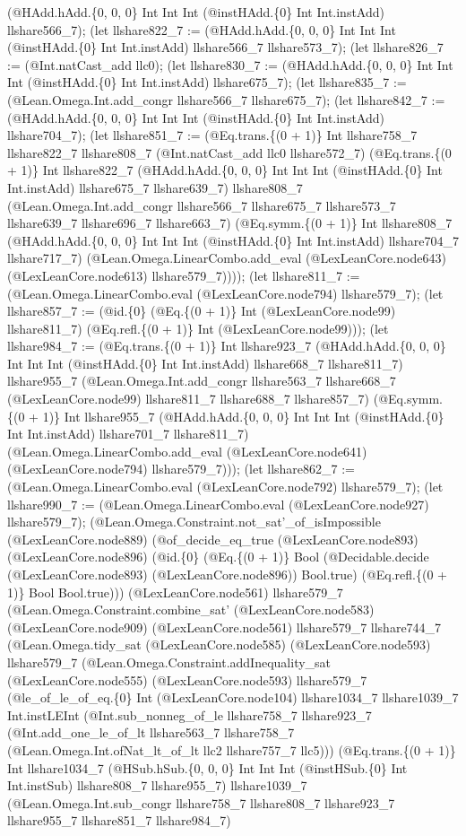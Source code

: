 \documentclass[11pt]{article}
\begin{document}
(@HAdd.hAdd.\{0, 0, 0\} Int Int Int (@instHAdd.\{0\} Int Int.instAdd) llshare566\_7); (let llshare822\_7 := (@HAdd.hAdd.\{0, 0, 0\} Int Int Int (@instHAdd.\{0\} Int Int.instAdd) llshare566\_7 llshare573\_7); (let llshare826\_7 := (@Int.natCast\_add llc0); (let llshare830\_7 := (@HAdd.hAdd.\{0, 0, 0\} Int Int Int (@instHAdd.\{0\} Int Int.instAdd) llshare675\_7); (let llshare835\_7 := (@Lean.Omega.Int.add\_congr llshare566\_7 llshare675\_7); (let llshare842\_7 := (@HAdd.hAdd.\{0, 0, 0\} Int Int Int (@instHAdd.\{0\} Int Int.instAdd) llshare704\_7); (let llshare851\_7 := (@Eq.trans.\{(0 + 1)\} Int llshare758\_7 llshare822\_7 llshare808\_7 (@Int.natCast\_add llc0 llshare572\_7) (@Eq.trans.\{(0 + 1)\} Int llshare822\_7 (@HAdd.hAdd.\{0, 0, 0\} Int Int Int (@instHAdd.\{0\} Int Int.instAdd) llshare675\_7 llshare639\_7) llshare808\_7 (@Lean.Omega.Int.add\_congr llshare566\_7 llshare675\_7 llshare573\_7 llshare639\_7 llshare696\_7 llshare663\_7) (@Eq.symm.\{(0 + 1)\} Int llshare808\_7 (@HAdd.hAdd.\{0, 0, 0\} Int Int Int (@instHAdd.\{0\} Int Int.instAdd) llshare704\_7 llshare717\_7) (@Lean.Omega.LinearCombo.add\_eval (@LexLeanCore.node643) (@LexLeanCore.node613) llshare579\_7)))); (let llshare811\_7 := (@Lean.Omega.LinearCombo.eval (@LexLeanCore.node794) llshare579\_7); (let llshare857\_7 := (@id.\{0\} (@Eq.\{(0 + 1)\} Int (@LexLeanCore.node99) llshare811\_7) (@Eq.refl.\{(0 + 1)\} Int (@LexLeanCore.node99))); (let llshare984\_7 := (@Eq.trans.\{(0 + 1)\} Int llshare923\_7 (@HAdd.hAdd.\{0, 0, 0\} Int Int Int (@instHAdd.\{0\} Int Int.instAdd) llshare668\_7 llshare811\_7) llshare955\_7 (@Lean.Omega.Int.add\_congr llshare563\_7 llshare668\_7 (@LexLeanCore.node99) llshare811\_7 llshare688\_7 llshare857\_7) (@Eq.symm.\{(0 + 1)\} Int llshare955\_7 (@HAdd.hAdd.\{0, 0, 0\} Int Int Int (@instHAdd.\{0\} Int Int.instAdd) llshare701\_7 llshare811\_7) (@Lean.Omega.LinearCombo.add\_eval (@LexLeanCore.node641) (@LexLeanCore.node794) llshare579\_7))); (let llshare862\_7 := (@Lean.Omega.LinearCombo.eval (@LexLeanCore.node792) llshare579\_7); (let llshare990\_7 := (@Lean.Omega.LinearCombo.eval (@LexLeanCore.node927) llshare579\_7); (@Lean.Omega.Constraint.not\_sat'\_of\_isImpossible (@LexLeanCore.node889) (@of\_decide\_eq\_true (@LexLeanCore.node893) (@LexLeanCore.node896) (@id.\{0\} (@Eq.\{(0 + 1)\} Bool (@Decidable.decide (@LexLeanCore.node893) (@LexLeanCore.node896)) Bool.true) (@Eq.refl.\{(0 + 1)\} Bool Bool.true))) (@LexLeanCore.node561) llshare579\_7 (@Lean.Omega.Constraint.combine\_sat' (@LexLeanCore.node583) (@LexLeanCore.node909) (@LexLeanCore.node561) llshare579\_7 llshare744\_7 (@Lean.Omega.tidy\_sat (@LexLeanCore.node585) (@LexLeanCore.node593) llshare579\_7 (@Lean.Omega.Constraint.addInequality\_sat (@LexLeanCore.node555) (@LexLeanCore.node593) llshare579\_7 (@le\_of\_le\_of\_eq.\{0\} Int (@LexLeanCore.node104) llshare1034\_7 llshare1039\_7 Int.instLEInt (@Int.sub\_nonneg\_of\_le llshare758\_7 llshare923\_7 (@Int.add\_one\_le\_of\_lt llshare563\_7 llshare758\_7 (@Lean.Omega.Int.ofNat\_lt\_of\_lt llc2 llshare757\_7 llc5))) (@Eq.trans.\{(0 + 1)\} Int llshare1034\_7 (@HSub.hSub.\{0, 0, 0\} Int Int Int (@instHSub.\{0\} Int Int.instSub) llshare808\_7 llshare955\_7) llshare1039\_7 (@Lean.Omega.Int.sub\_congr llshare758\_7 llshare808\_7 llshare923\_7 llshare955\_7 llshare851\_7 llshare984\_7) 
\end{document}
